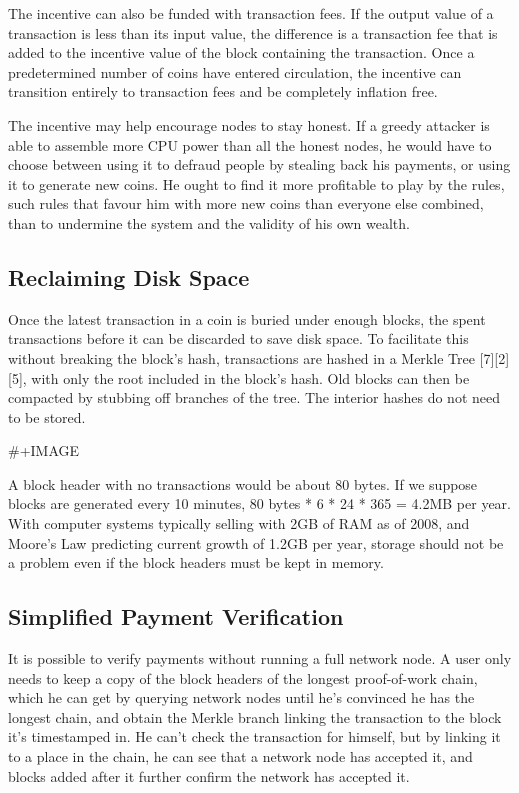 \documentclass[11pt]{article}
\begin{document}
The incentive can also be funded with transaction fees.
If the output value of a transaction is less than its input value, the difference is a transaction fee that is added to the incentive value of the block containing the transaction.
Once a predetermined number of coins have entered circulation, the incentive can transition entirely to transaction fees and be completely inflation free.

The incentive may help encourage nodes to stay honest.
If a greedy attacker is able to assemble more CPU power than all the honest nodes, he would have to choose between using it to defraud people by stealing back his payments, or using it to generate new coins.
He ought to find it more profitable to play by the rules, such rules that favour him with more new coins than everyone else combined, than to undermine the system and the validity of his own wealth.

\subsection{Reclaiming Disk Space}
\label{sec:orgfda4ea0}
Once the latest transaction in a coin is buried under enough blocks, the spent transactions before it can be discarded to save disk space.
To facilitate this without breaking the block's hash, transactions are hashed in a Merkle Tree [7][2][5], with only the root included in the block's hash.
Old blocks can then be compacted by stubbing off branches of the tree.
The interior hashes do not need to be stored.

\#+IMAGE

A block header with no transactions would be about 80 bytes.
If we suppose blocks are generated every 10 minutes, 80 bytes * 6 * 24 * 365 = 4.2MB per year.
With computer systems typically selling with 2GB of RAM as of 2008, and Moore's Law predicting current growth of 1.2GB per year, storage should not be a problem even if the block headers must be kept in memory.

\subsection{Simplified Payment Verification}
\label{sec:orgf03af63}
It is possible to verify payments without running a full network node.
A user only needs to keep a copy of the block headers of the longest proof-of-work chain, which he can get by querying network nodes until he's convinced he has the longest chain, and obtain the Merkle branch linking the transaction to the block it's timestamped in.
He can't check the transaction for himself, but by linking it to a place in the chain, he can see that a network node has accepted it, and blocks added after it further confirm the network has accepted it.
\end{document}
